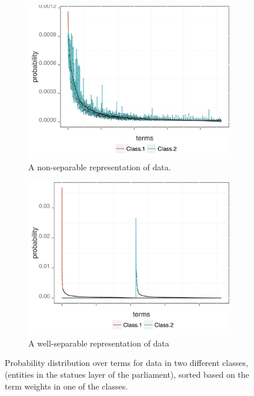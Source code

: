 \begin{figure}[t]
\centering
\begin{subfigure}{0.49\textwidth}
\includegraphics[width=\linewidth]{02-part-01/chapter-03/figs_and_tables/img_example-slm.png}
\caption{\label{fig:sep-slm} \scriptsize{A non\:-\:separable representation of data.}}
\end{subfigure}
\hfill
\begin{subfigure}{0.49\textwidth}
\includegraphics[width=\linewidth]{02-part-01/chapter-03/figs_and_tables/img_example-swlm.png}
\caption{\label{fig:sep-swlm} \scriptsize{A well\:-\:separable representation of data}}
\end{subfigure}
\caption{\label{fig:sep_rep} Probability distribution over terms for data in two different classes, (entities in the statues layer of the parliament), sorted based on the term weights in one of the classes.}
\end{figure}